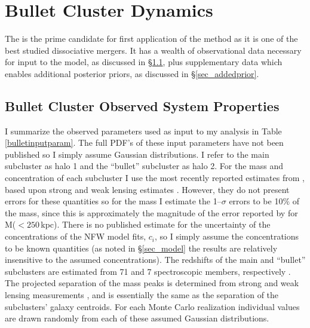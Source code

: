 \documentclass[12pt]{emulateapj}
\begin{document}
\section{Bullet Cluster Dynamics}\label{sec_bullet}

The  is the prime candidate for first application of the method as it is one of the best studied dissociative mergers.
It has a wealth of observational data necessary for input to the model, as discussed in \S\ref{sec_bc_obsprop}, plus supplementary data which enables additional posterior priors, as discussed in \S\ref{sec_addedprior}.

\subsection{Bullet Cluster Observed System Properties}\label{sec_bc_obsprop}

I summarize the observed  parameters used as input to my analysis in Table \ref{bulletinputparam}.  
The full PDF's of these input parameters have not been published so I simply assume Gaussian distributions.
I refer to the main subcluster as halo 1 and the ``bullet'' subcluster as halo 2.  
For the mass and concentration of each subcluster I use the most recently reported estimates from \citet{Springel:2007bg}, based upon strong and weak lensing estimates \citep{Bradac:2006be}.
However, they do not present errors for these quantities so for the mass I estimate the  1--$\sigma$ errors to be 10\% of the mass, since this is approximately the magnitude of the error reported by \citet{Bradac:2006be} for M($<250$\,kpc).
There is no published estimate for the uncertainty of the concentrations of the NFW model fits, $c_i$, so I simply assume the concentrations to be known quantities (as noted in \S\ref{sec_model} the results are relatively insensitive to the assumed concentrations). 
The redshifts of the main and ``bullet'' subclusters are estimated from 71 and 7 spectroscopic members, respectively \citep{Barrena:2002dj}.
The projected separation of the mass peaks is determined from strong and weak lensing measurements \citep{Bradac:2006be}, and is essentially the same as the separation of the subclusters' galaxy centroids.
For each Monte Carlo realization individual values are drawn randomly from each of these assumed Gaussian distributions.
\end{document}
